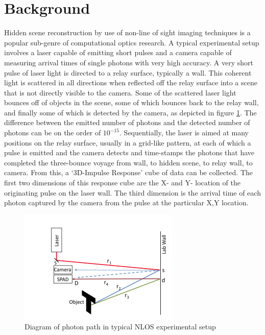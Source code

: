 \documentclass[conference]{IEEEtran}
\begin{document}
\section{Background}
Hidden scene reconstruction by use of non-line of sight imaging techniques is a popular sub-genre of computational optics research. A typical experimental setup involves a laser capable of emitting short pulses and a camera capable of measuring arrival times of single photons with very high accuracy. A very short pulse of laser light is directed to a relay surface, typically a wall. This coherent light is scattered in all directions when reflected off the relay surface into a scene that is not directly visible to the camera. Some of the scattered laser light bounces off of objects in the scene, some of which bounces back to the relay wall, and finally some of which is detected by the camera, as depicted in figure \ref{fig:2dsetup}. The difference between the emitted number of photons and the detected number of photons can be on the order of $10^{-15}$. Sequentially, the laser is aimed at many positions on the relay surface, usually in a grid-like pattern, at each of which a pulse is emitted and the camera detects and time-stamps the photons that have completed the three-bounce voyage from wall, to hidden scene, to relay wall, to camera. From this, a `3D-Impulse Response' cube of data can be collected. The first two dimensions of this response cube are the X- and Y- location of the originating pulse on the laser wall. The third dimension is the arrival time of each photon captured by the camera from the pulse at the particular X,Y location.

\begin{figure}
    \centering
    \includegraphics[width=\columnwidth]{figures/2dsetup.png}
    \caption{Diagram of photon path in typical NLOS experimental setup}
    \label{fig:2dsetup}
\end{figure}
\end{document}
